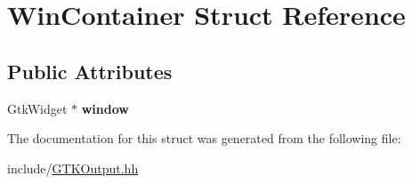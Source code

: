 \hypertarget{structWinContainer}{}\section{Win\+Container Struct Reference}
\label{structWinContainer}
\subsection*{Public Attributes}
\begin{DoxyCompactItemize}
\item 
\mbox{\label{structWinContainer_a6e871dba074f9e341c0341c7a5f91969}} 
Gtk\+Widget $\ast$ {\bfseries window}
\end{DoxyCompactItemize}


The documentation for this struct was generated from the following file\+:\begin{DoxyCompactItemize}
\item 
include/\hyperlink{GTKOutput_8hh}{G\+T\+K\+Output.\+hh}\end{DoxyCompactItemize}
